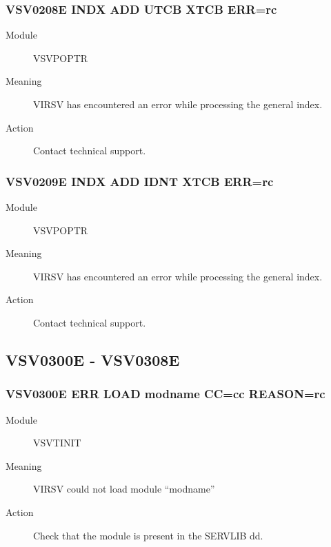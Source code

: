 \documentclass[letterpaper,10pt,english]{sphinxmanual}
\begin{document}
\subsubsection{VSV0208E INDX ADD UTCB XTCB ERR=rc}
\label{\detokenize{messages:vsv0208e-indx-add-utcb-xtcb-err-rc}}\begin{description}
\item[{Module}] \leavevmode
VSVPOPTR

\item[{Meaning}] \leavevmode
VIRSV has encountered an error while processing the general index.

\item[{Action}] \leavevmode
Contact technical support.

\end{description}


\subsubsection{VSV0209E INDX ADD IDNT XTCB ERR=rc}
\label{\detokenize{messages:vsv0209e-indx-add-idnt-xtcb-err-rc}}\begin{description}
\item[{Module}] \leavevmode
VSVPOPTR

\item[{Meaning}] \leavevmode
VIRSV has encountered an error while processing the general index.

\item[{Action}] \leavevmode
Contact technical support.

\end{description}


\subsection{VSV0300E - VSV0308E}
\label{\detokenize{messages:vsv0300e-vsv0308e}}

\subsubsection{VSV0300E ERR LOAD modname CC=cc REASON=rc}
\label{\detokenize{messages:vsv0300e-err-load-modname-cc-cc-reason-rc}}\begin{description}
\item[{Module}] \leavevmode
VSVTINIT

\item[{Meaning}] \leavevmode
VIRSV could not load module “modname”

\item[{Action}] \leavevmode
Check that the module is present in the SERVLIB dd.

\end{description}
\end{document}
